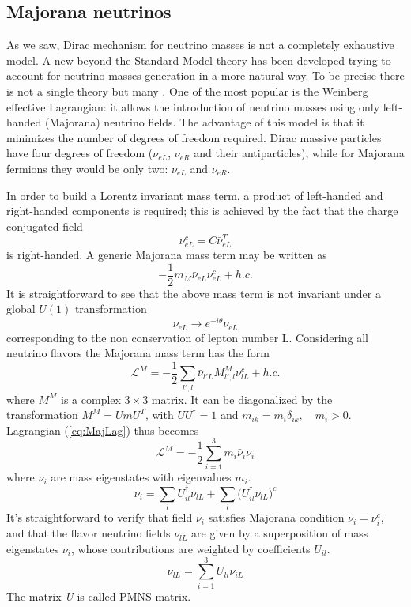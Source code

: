 \documentclass{subnucbo}
\begin{document}
\subsection{Majorana neutrinos}
As we saw, Dirac mechanism for neutrino masses is not a completely exhaustive model.
A new beyond-the-Standard Model theory has been developed trying to account for neutrino masses generation in a more natural way. To be precise there is not a single theory but many \cite{ref:Bronc}\cite{ref:Bil}\cite{ref:front}. 
One of the most popular is the Weinberg effective Lagrangian: it allows the introduction of neutrino masses using only left-handed (Majorana) neutrino fields.
The advantage of this model is that it minimizes the number of degrees of freedom required. 
Dirac massive particles have four degrees of freedom ($\nu_{eL}$, $\nu_{eR}$ and their antiparticles), while for Majorana fermions they would be only two: $\nu_{eL}$ and $\nu_{eR}$. 

In order to build a Lorentz invariant mass term, a product of left-handed and right-handed components is required; this is achieved by the fact that the charge conjugated field
\begin{equation}
\nu_{eL}^c=C\bar{\nu}_{eL}^T
\end{equation}
is right-handed. A generic Majorana mass term may be written as
\begin{equation}
-\frac{1}{2}m_M\bar{\nu}_{eL}\nu_{eL}^c+h.c.
\end{equation}
It is straightforward to see that the above mass term is not invariant under a global $U(1)$ transformation
\begin{equation}
\nu_{eL}\rightarrow e^{-i\theta}\nu_{eL}
\end{equation}
corresponding to the non conservation of lepton number L.
Considering all neutrino flavors the Majorana mass term has the form
\begin{equation}
\label{eq:MajLag}
\mathcal{L}^M=-\frac{1}{2}\sum_{l',l}\bar{\nu}_{l'L}M_{l',l}^M\nu_{lL}^c+h.c.
\end{equation}
where $M^M$ is a complex $3\times3$ matrix. It can be diagonalized by the transformation $M^M=UmU^T$, with $UU^{\dagger}=1$ and  $m_{ik}=m_i\delta_{ik},\quad m_i>0$.
Lagrangian (\ref{eq:MajLag}) thus becomes
\begin{equation}
\mathcal{L}^M=-\frac{1}{2}\sum_{i=1}^3m_i\bar{\nu}_i\nu_i
\end{equation}
where $\nu_i$ are mass eigenstates with eigenvalues $m_i$.
\begin{equation}
\nu_i=\sum_lU_{il}^{\dagger}\nu_{lL}+\sum_l\bigl(U_{il}^{\dagger}\nu_{lL}\bigr)^c
\end{equation}
It's straightforward to verify that field $\nu_i$ satisfies Majorana condition $\nu_i=\nu_i^c$, and that the flavor neutrino fields $\nu_{lL}$ are given by a superposition of mass eigenstates $\nu_i$, whose contributions are weighted by coefficients $U_{il}$. 
\begin{equation}
\label{eq:nuMix}
\nu_{lL}=\sum_{i=1}^3U_{li}\nu_{iL}
\end{equation}
The matrix \emph{U} is called PMNS matrix.
\end{document}
